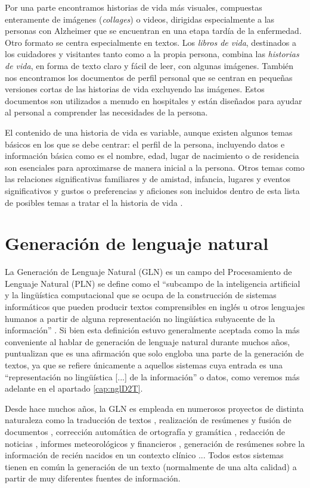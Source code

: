 Por una parte encontramos historias de vida más visuales, compuestas enteramente de imágenes (\textit{collages}) o videos, dirigidas especialmente a las personas con Alzheimer que se encuentran en una etapa tardía de la enfermedad. Otro formato se centra especialmente en textos. Los \textit{libros de vida}, destinados a los cuidadores y visitantes tanto como a la propia persona, combina las \textit{historias de vida}, en forma de texto claro y fácil de leer, con algunas imágenes. También nos encontramos los documentos de perfil personal que se centran en pequeñas versiones cortas de las historias de vida excluyendo las imágenes. Estos documentos son utilizados a menudo en hospitales y están diseñados para ayudar al personal a comprender las necesidades de la persona.

El contenido de una historia de vida es variable, aunque existen algunos temas básicos en los que se debe centrar: el perfil de la persona, incluyendo datos e información básica como es el nombre, edad, lugar de nacimiento o de residencia son esenciales para aproximarse de manera inicial a la persona. Otros temas como las relaciones significativas familiares y de amistad, infancia, lugares y eventos significativos y gustos o preferencias y aficiones son incluidos dentro de esta lista de posibles temas a tratar el la historia de vida \citep{thompsonlifestory}.

\section{Generación de lenguaje natural}

La Generación de Lenguaje Natural (GLN) es un campo del Procesamiento de Lenguaje Natural (PLN) se define como el ``subcampo de la inteligencia artificial y la lingüística computacional que se ocupa de la construcción de sistemas informáticos que pueden producir textos comprensibles en inglés u otros lenguajes humanos a partir de alguna representación no lingüística subyacente de la información''  \citep{reiter1997building}. Si bien esta definición estuvo generalmente aceptada como la más conveniente al hablar de generación de lenguaje natural durante muchos años, \cite{gatt2018survey} puntualizan que es una afirmación que solo engloba una parte de la generación de textos, ya que se refiere únicamente a aquellos sistemas cuya entrada es una ``representación no lingüística [...] de la información'' o datos, como veremos más adelante en el apartado \ref{cap:nglD2T}.

Desde hace muchos años, la GLN es empleada en numerosos proyectos de distinta naturaleza como la traducción de textos \citep{Cho2014LearningPR}, realización de resúmenes y fusión de documentos \citep{clarke2010discourse}, corrección automática de ortografía y gramática \citep{islam2018bangla}, redacción de noticias \citep{leppanen2017data}, informes meteorológicos \citep{sripada2014case} y financieros \citep{ren2021hybrid}, generación de resúmenes sobre la información de recién nacidos en un contexto clínico \citep{BabyTalk}... Todos estos sistemas tienen en común la generación de un texto (normalmente de una alta calidad) a partir de muy diferentes fuentes de información.

